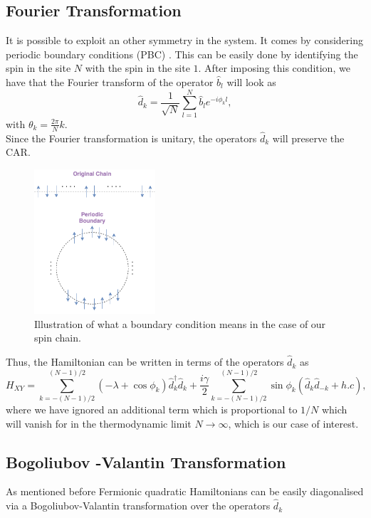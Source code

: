 \subsection{Fourier Transformation}
It is possible to exploit an other symmetry in the system. It comes by considering periodic boundary conditions (PBC)\cite{reyes-lega_aspects_2016} . This can be easily done by identifying the spin in the site $N$ with the spin in the site $1$. After imposing this condition, we have that the Fourier transform of the operator $\hat{b}_l$ will look as
\begin{equation}
\hat{d}_{k}=\frac{1}{\sqrt{N}} \sum_{l=1}^{N} \hat{b}_{l} e^{-i \phi_{k} l},
\end{equation}
with $\theta_{k}=\frac{2 \pi}{N} k$.\\
Since the Fourier transformation is unitary, the operators $\hat{d}_k$ will preserve the CAR.
\begin{figure}[H]
    \centering
    \includegraphics[width=0.4\textwidth]{Figures/Periodic_boundaries.png}
    \caption{Illustration of what a boundary condition means in the case of our spin chain.}
    \label{periodic condition}
\end{figure}
Thus, the Hamiltonian can be written in terms of the operators $\hat{d}_k$ as
\begin{equation}
H_{X Y}=\sum_{k=-(N-1) / 2}^{(N-1) / 2}\left(-\lambda+\cos \phi_{k}\right) \hat{d}_{k}^{\dagger} \hat{d}_{k}+\frac{i \gamma}{2} \sum_{k=-(N-1) / 2}^{(N-1) / 2} \sin \phi_{k}\left(\hat{d}_{k} \hat{d}_{-k}+h . c\right),
\end{equation}
where we have ignored an additional term which is proportional to $1/N$ which will vanish for in the thermodynamic limit $N\to \infty$\cite{barouch_statistical_1970,barouch_statistical_1971}, which is our case of interest.
\subsection{Bogoliubov -Valantin Transformation}
As mentioned before Fermionic quadratic Hamiltonians can be easily diagonalised via a Bogoliubov-Valantin transformation over the operators $\hat{d}_k$


